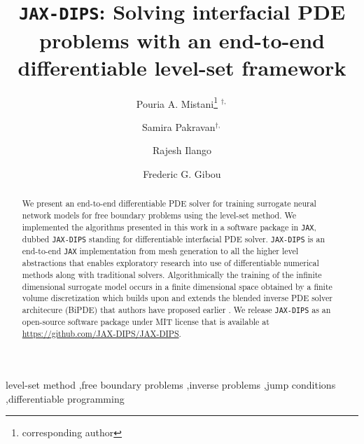 \documentclass{elsarticle}
\begin{document}
\title{\texttt{JAX-DIPS}: Solving interfacial PDE problems with an end-to-end differentiable level-set framework}



\author[1]{Pouria A. Mistani\thanks{corresponding author} $^{\dagger,}$}
\author[2]{Samira Pakravan$^{\dagger,}$}
\author[1]{Rajesh Ilango}
\author[2]{Frederic G. Gibou}

\address[1]{NVIDIA Corporation, Santa Clara, CA 95051, USA}
\address[2]{University of California, Santa Barbara, CA 93106-5070, USA}

\begin{abstract}
	We present an end-to-end differentiable PDE solver for training surrogate neural network models for free boundary problems using the level-set method. We implemented the algorithms presented in this work in a software package in \texttt{JAX}, dubbed \texttt{JAX-DIPS} standing for differentiable interfacial PDE solver. \texttt{JAX-DIPS} is an end-to-end \texttt{JAX} implementation from mesh generation to all the higher level abstractions that enables exploratory research into use of differentiable numerical methods along with traditional solvers. Algorithmically the training of the infinite dimensional surrogate model occurs in a finite dimensional space obtained by a finite volume discretization which builds upon and extends the blended inverse PDE solver architecure (BiPDE) that authors have proposed earlier \cite{pakravan2021solving}. We release \texttt{JAX-DIPS} as an open-source software package under MIT license that is available at \href{https://github.com/JAX-DIPS/JAX-DIPS}{https://github.com/JAX-DIPS/JAX-DIPS}.

\end{abstract}

\begin{keyword}
	level-set method \sep free boundary problems \sep inverse problems \sep jump conditions \sep differentiable programming
\end{keyword}

\maketitle
\def\thefootnote{$\dagger$}
\end{document}
